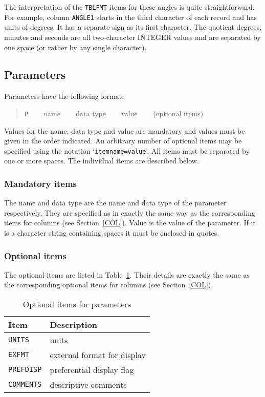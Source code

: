 \documentclass[twoside,11pt]{article}
\renewcommand{\_}{\texttt{\symbol{95}}}
\begin{document}
The interpretation of the {\tt TBLFMT} items for these angles is quite
straightforward.  For example, column {\tt ANGLE1} starts in the third
character of each record and has units of degrees.  It has a separate
sign as its first character.  The quotient degrees, minutes and
seconds are all two-character INTEGER values and are separated by 
one space (or rather by any single character).

\subsection{Parameters \label{PAR}}

Parameters have the following format:

\begin{quote}
{\tt P} ~~~ name ~~~ data type ~~~ value ~~~ (optional items)
\end{quote}

Values for the name, data type and value are mandatory and values
must be given in the order indicated.  An arbitrary number of optional
items may be specified using the notation `{\tt item\_name=value}'.
All items must be separated by one or more spaces.  The individual
items are described below.

\subsubsection{Mandatory items}

The name and data type are the name and data type of the parameter
respectively.  They are specified as in exactly the same way as the
corresponding items for columns (see Section~\ref{COL}).  Value is the
value of the parameter.  If it is a character string containing spaces
it must be enclosed in quotes.

\subsubsection{Optional items}

The optional items are listed in Table~\ref{PAR_OPT}. Their details
are exactly the same as the corresponding optional items for columns
(see Section~\ref{COL}).

\begin{table}[htbp]

\begin{center}
\begin{tabular}{ll}
Item           & Description                   \\ \hline
{\tt UNITS}    & units                         \\
{\tt EXFMT}    & external format for display   \\
{\tt PREFDISP} & preferential display flag     \\
{\tt COMMENTS} & descriptive comments          \\
\end{tabular}

\caption{Optional items for parameters \label{PAR_OPT} }

\end{center}
\end{table}
\end{document}
